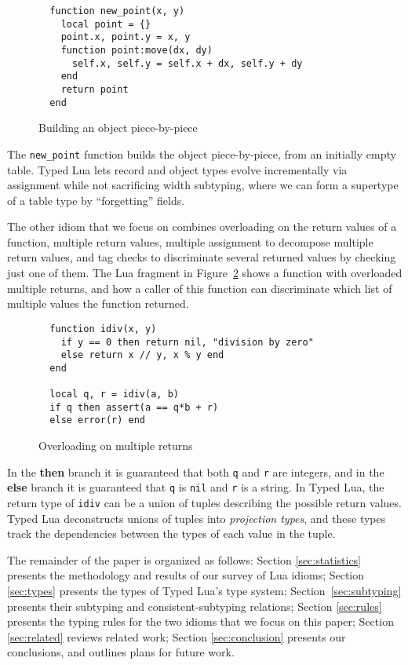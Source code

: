 \documentclass[10pt]{sigplanconf}
\begin{document}
\begin{figure}[t]
{\footnotesize
\begin{verbatim}
  function new_point(x, y)
    local point = {}
    point.x, point.y = x, y
    function point:move(dx, dy)
      self.x, self.y = self.x + dx, self.y + dy
    end
    return point
  end
\end{verbatim}
}
\caption{Building an object piece-by-piece}
\label{fig:newpoint}
\end{figure}

The {\tt new\_point} function builds the object piece-by-piece,
from an initially empty table. Typed Lua
lets record and object types evolve incrementally 
via assignment while not sacrificing width subtyping,
where we can form a supertype of a table type by ``forgetting'' fields.

The other idiom that we focus on combines overloading on the return values of a function, multiple return values, multiple assignment
to decompose multiple return values,
and tag checks to discriminate several returned values
by checking just one of them. The Lua fragment in Figure~\ref{fig:over} shows a function with overloaded multiple
returns, and how a caller of this function can discriminate
which list of multiple values the function returned.

\begin{figure}[t]
{\footnotesize
\begin{verbatim}
  function idiv(x, y)
    if y == 0 then return nil, "division by zero"
    else return x // y, x % y end 
  end
  
  local q, r = idiv(a, b)
  if q then assert(a == q*b + r)
  else error(r) end
\end{verbatim}
}
\caption{Overloading on multiple returns}
\label{fig:over}
\end{figure}

In the {\bf then} branch it is guaranteed that both {\tt q}
and {\tt r} are integers, and in the {\bf else} branch it is
guaranteed that {\tt q} is {\tt nil} and {\tt r} is a string.
In Typed Lua, the return type of {\tt idiv} can be a union of
tuples describing the possible return values. Typed Lua deconstructs unions of tuples into {\em projection types}, and these types track
the dependencies between the types of each value in the tuple.

The remainder of the paper is organized as follows:
Section \ref{sec:statistics} presents the methodology and results of
our survey of Lua idioms;
Section \ref{sec:types} presents the types of Typed Lua's
type system; Section~\ref{sec:subtyping} presents
their subtyping and consistent-subtyping relations;
Section \ref{sec:rules} presents the typing rules
for the two idioms that we focus on this paper;
Section \ref{sec:related} reviews related work;
Section \ref{sec:conclusion} presents our conclusions,
and outlines plans for future work.
\end{document}
